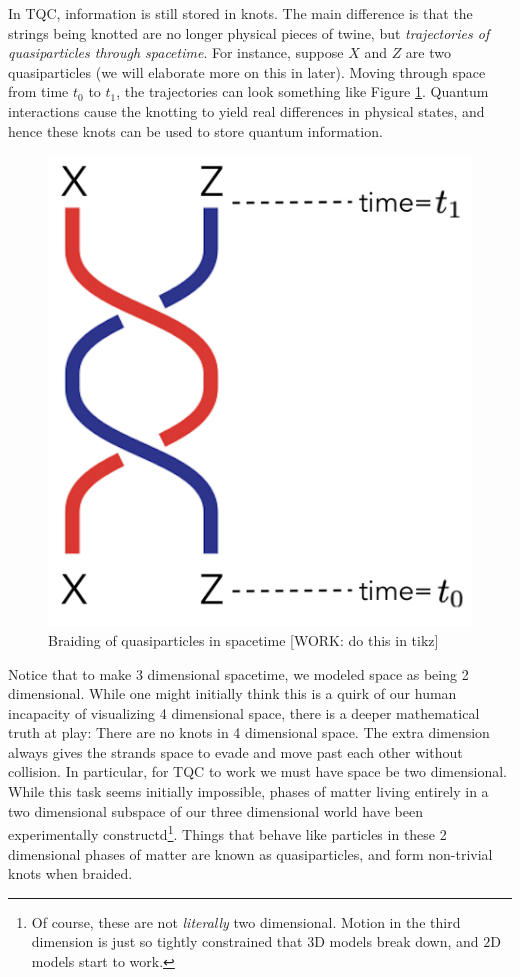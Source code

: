 \documentclass{article}
\theoremstyle{definition}
\numberwithin{figure}{section}
\begin{document}
In TQC, information is still stored in knots. The main difference is that the strings being knotted are no longer physical pieces of twine, but \textit{trajectories of quasiparticles through spacetime}. For instance, suppose $X$ and $Z$ are two quasiparticles (we will elaborate more on this in later). Moving through space from time $t_0$ to $t_1$, the trajectories can look something like Figure \ref{fig:braiding}. Quantum interactions cause the knotting to yield real differences in physical states, and hence these knots can be used to store quantum information.

\begin{figure}
\begin{center}
\includegraphics[scale=0.25]{braiding}
\caption{Braiding of quasiparticles in spacetime [WORK: do this in tikz]}
\label{fig:braiding}
\end{center}
\end{figure}

Notice that to make 3 dimensional spacetime, we modeled space as being 2 dimensional. While one might initially think this is a quirk of our human incapacity of visualizing 4 dimensional space, there is a deeper mathematical truth at play: There are no knots in 4 dimensional space. The extra dimension always gives the strands space to evade and move past each other without collision. In particular, for TQC to work we must have space be two dimensional. While this task seems initially impossible, phases of matter living entirely in a two dimensional subspace of our three dimensional world have been experimentally constructd\footnote{Of course, these are not \textit{literally} two dimensional. Motion in the third dimension is just so tightly constrained that $3$D models break down, and $2$D models start to work.}. Things that behave like particles in these 2 dimensional phases of matter are known as quasiparticles, and form non-trivial knots when braided.
\end{document}

